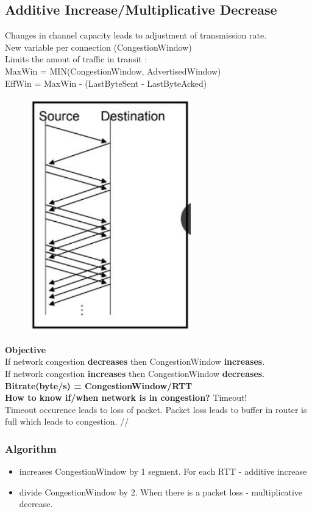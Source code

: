 \documentclass[../resumosRCOM.tex]{subfiles}
\begin{document}
\subsection{Additive Increase/Multiplicative Decrease}
Changes in channel capacity leads to adjustment of transmission rate.\\
New variable per connection (CongestionWindow)\\
Limits the amout of traffic in transit :\\
MaxWin = MIN(CongestionWindow, AdvertisedWindow)\\
EffWin = MaxWin - (LastByteSent - LastByteAcked)\\

\begin{figure}[h]
    \centering
    \includegraphics[width=7cm]{images/trans11.JPG}
\end{figure}

\textbf{Objective}\\
If network congestion \textbf{decreases} then CongestionWindow \textbf{increases}.\\
If network congestion \textbf{increases} then CongestionWindow \textbf{decreases}.\\
\textbf{Bitrate(byte/s) = CongestionWindow/RTT}\\

\textbf{How to know if/when network is in congestion?} Timeout!\\
Timeout occurence leads to loss of packet. Packet loss leads to buffer in router is full which leads to congestion. //

\subsubsection{Algorithm}
\begin{itemize}
    \item increases CongestionWindow by 1 segment. For each RTT - additive increase
    \item divide CongestionWindow by 2. When there is a packet loss - multiplicative decrease.
\end{itemize}
\end{document}
